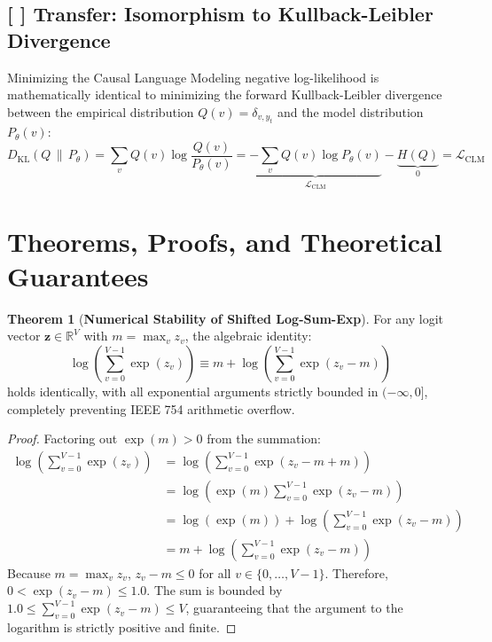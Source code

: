 \documentclass[11pt,a4paper]{article}
\theoremstyle{definition}
\newtheorem{theorem}{\textbf{Theorem}}[section]
\begin{document}
\subsection{[ ] Transfer: Isomorphism to Kullback-Leibler Divergence}
Minimizing the Causal Language Modeling negative log-likelihood is mathematically identical to minimizing the forward Kullback-Leibler divergence between the empirical distribution $Q(v) = \delta_{v, y_t}$ and the model distribution $P_{\theta}(v)$:
{\boldmath
\begin{equation}
D_{\text{KL}}(Q \,\|\, P_{\theta}) = \sum_{v} Q(v) \log \frac{Q(v)}{P_{\theta}(v)} = \underbrace{- \sum_v Q(v) \log P_{\theta}(v)}_{\mathcal{L}_{\text{CLM}}} - \underbrace{H(Q)}_{0} = \mathcal{L}_{\text{CLM}}
\end{equation}
}

\section{Theorems, Proofs, and Theoretical Guarantees}

\begin{theorem}[\textbf{Numerical Stability of Shifted Log-Sum-Exp}]
For any logit vector $\mathbf{z} \in \mathbb{R}^V$ with $m = \max_v z_v$, the algebraic identity:
{\boldmath
\begin{equation}
\log \left( \sum_{v=0}^{V-1} \exp(z_v) \right) \equiv m + \log \left( \sum_{v=0}^{V-1} \exp(z_v - m) \right)
\end{equation}
}
holds identically, with all exponential arguments strictly bounded in $(-\infty, 0]$, completely preventing IEEE 754 arithmetic overflow.
\end{theorem}

\begin{proof}
Factoring out $\exp(m) > 0$ from the summation:
{\boldmath
\begin{align}
\log \left( \sum_{v=0}^{V-1} \exp(z_v) \right) &= \log \left( \sum_{v=0}^{V-1} \exp(z_v - m + m) \right) \\
&= \log \left( \exp(m) \sum_{v=0}^{V-1} \exp(z_v - m) \right) \\
&= \log(\exp(m)) + \log \left( \sum_{v=0}^{V-1} \exp(z_v - m) \right) \\
&= m + \log \left( \sum_{v=0}^{V-1} \exp(z_v - m) \right)
\end{align}
}
Because $m = \max_v z_v$, $z_v - m \le 0$ for all $v \in \{0, \dots, V-1\}$. Therefore, $0 < \exp(z_v - m) \le 1.0$. The sum is bounded by $1.0 \le \sum_{v=0}^{V-1} \exp(z_v - m) \le V$, guaranteeing that the argument to the logarithm is strictly positive and finite.
\end{proof}
\end{document}

